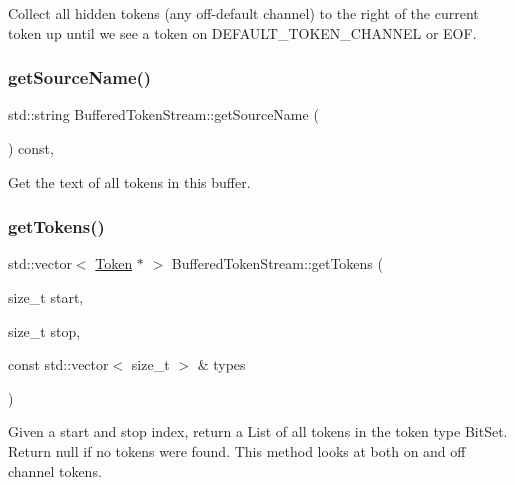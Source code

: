 Collect all hidden tokens (any off-\/default channel) to the right of the current token up until we see a token on D\+E\+F\+A\+U\+L\+T\+\_\+\+T\+O\+K\+E\+N\+\_\+\+C\+H\+A\+N\+N\+EL or E\+OF. 

\mbox{\label{classantlr4_1_1BufferedTokenStream_ac623cc25ef85bed24d4a387bc6ad5663}} 
\subsubsection{\texorpdfstring{get\+Source\+Name()}{getSourceName()}}
{\footnotesize\ttfamily std\+::string Buffered\+Token\+Stream\+::get\+Source\+Name (\begin{DoxyParamCaption}{ }\end{DoxyParamCaption}) const\hspace{0.3cm}{\ttfamily [override]}, {\ttfamily [virtual]}}

Get the text of all tokens in this buffer. \mbox{\label{classantlr4_1_1BufferedTokenStream_a1da75f1766b2758b16be452bc1e06681}} 
\subsubsection{\texorpdfstring{get\+Tokens()}{getTokens()}}
{\footnotesize\ttfamily std\+::vector$<$ \hyperlink{classantlr4_1_1Token}{Token} $\ast$ $>$ Buffered\+Token\+Stream\+::get\+Tokens (\begin{DoxyParamCaption}\item[{size\+\_\+t}]{start,  }\item[{size\+\_\+t}]{stop,  }\item[{const std\+::vector$<$ size\+\_\+t $>$ \&}]{types }\end{DoxyParamCaption})\hspace{0.3cm}{\ttfamily [virtual]}}



Given a start and stop index, return a List of all tokens in the token type Bit\+Set. Return null if no tokens were found. This method looks at both on and off channel tokens. 



